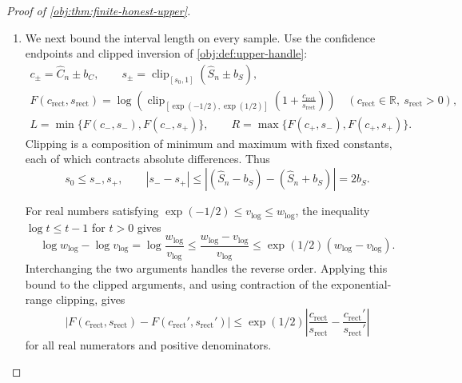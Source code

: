 \documentclass[11pt]{article}
\begin{document}
\begin{proof}[Proof of \cref{obj:thm:finite-honest-upper}]
\begin{enumerate}
By \cref{obj:lem:observable-odds},
\[
C(P)=\{\exp(\theta(P))-1\}S(P),
\qquad S(P)\ge s_0.
\]
The product defining \(S(P)\) is at most one pointwise, so
\[
S(P)
=\int p_{10}(P,x)p_{01}(P,x)\,\lambda(dx)\le1,
\]
where the two conditional off-diagonal probabilities are
\[
p_{10}(P,x)=P(A=1,Y=0\mid X=x),
\qquad
p_{01}(P,x)=P(A=0,Y=1\mid X=x).
\]
Since \(|\theta(P)|\le1/2\), the exponential derivative is bounded by
\(\exp(1/2)\) on the segment between \(0\) and \(\theta(P)\). Therefore
\[
|\exp(\theta(P))-1|
\le\exp(1/2)|\theta(P)|,
\qquad
|C(P)|\le\exp(1/2)|\theta(P)|.
\]
In particular, for \(P\in\mathcal M_r(\alpha,\beta)\),
\[
\mathbb E_{P,n}|\widehat C_n|
\le\exp(1/2)r+b_C.
\]

\item We next bound the interval length on every sample. Use the confidence endpoints and clipped inversion of \cref{obj:def:upper-handle}:
\[
\begin{gathered}
c_\pm=\widehat C_n\pm b_C,
\qquad
s_\pm=\operatorname{clip}_{[s_0,1]}(\widehat S_n\pm b_S),\\
F(c_{\mathrm{rect}},s_{\mathrm{rect}})
=
\log\!\left(
\operatorname{clip}_{[\exp(-1/2),\exp(1/2)]}
\left(1+\frac{c_{\mathrm{rect}}}{s_{\mathrm{rect}}}\right)
\right)
\quad
(c_{\mathrm{rect}}\in\mathbb R,\ s_{\mathrm{rect}}>0),\\
L=\min\{F(c_-,s_-),F(c_-,s_+)\},
\qquad
R=\max\{F(c_+,s_-),F(c_+,s_+)\}.
\end{gathered}
\]
Clipping is a composition of minimum and maximum with fixed constants, each of which contracts absolute differences. Thus
\[
s_0\le s_-,s_+,
\qquad
|s_--s_+|
\le|(\widehat S_n-b_S)-(\widehat S_n+b_S)|
=2b_S.
\]

For real numbers satisfying
\(\exp(-1/2)\le v_{\log}\le w_{\log}\), the inequality
\(\log t\le t-1\) for \(t>0\) gives
\[
\log w_{\log}-\log v_{\log}
=
\log\frac{w_{\log}}{v_{\log}}
\le
\frac{w_{\log}-v_{\log}}{v_{\log}}
\le
\exp(1/2)(w_{\log}-v_{\log}).
\]
Interchanging the two arguments handles the reverse order. Applying this bound to the clipped arguments, and using contraction of the exponential-range clipping, gives
\[
\left|
F(c_{\mathrm{rect}},s_{\mathrm{rect}})
-
F(c_{\mathrm{rect}}',s_{\mathrm{rect}}')
\right|
\le
\exp(1/2)
\left|
\frac{c_{\mathrm{rect}}}{s_{\mathrm{rect}}}
-
\frac{c_{\mathrm{rect}}'}{s_{\mathrm{rect}}'}
\right|
\]
for all real numerators and positive denominators.


\end{enumerate}
\end{proof}
\end{document}
